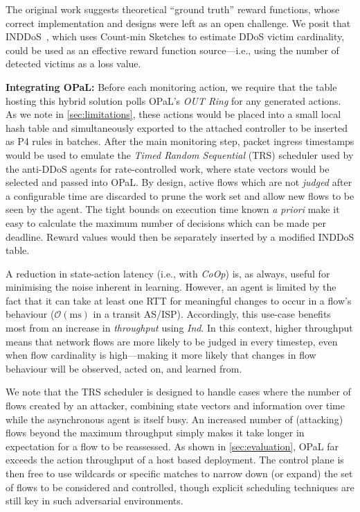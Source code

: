 \documentclass[sigconf,natbib=false]{acmart}
\newcommand{\fakepara}[1]{\noindent\textbf{#1:}}
\newcommand{\approachshort}{OPaL}
\newcommand{\Coopfw}{\emph{CoOp}}
\newcommand{\Indfw}{\emph{Ind}}
\begin{document}
The original work suggests theoretical ``ground truth'' reward functions, whose correct implementation and designs were left as an open challenge. 
We posit that INDDoS~\parencite{tnms-ddos-victim-ident}, which uses Count-min Sketches to estimate DDoS victim cardinality, could be used as an effective reward function source---i.e., using the number of detected victims as a loss value.

\fakepara{Integrating \approachshort}
Before each monitoring action, we require that the table hosting this hybrid solution polls \approachshort{}'s \emph{OUT Ring} for any generated actions.
As we note in \cref{sec:limitations}, these actions would be placed into a small local hash table and simultaneously exported to the attached controller to be inserted as P4 rules in batches.
After the main monitoring step, packet ingress timestamps would be used to emulate the \emph{Timed Random Sequential} (TRS) scheduler used by the anti-DDoS agents for rate-controlled work, where state vectors would be selected and passed into \approachshort.
By design, active flows which are not \emph{judged} after a configurable time are discarded to prune the work set and allow new flows to be seen by the agent.
The tight bounds on execution time known \emph{a priori} make it easy to calculate the maximum number of decisions which can be made per deadline.
Reward values would then be separately inserted by a modified INDDoS table.


A reduction in state-action latency (i.e., with \Coopfw) is, as always, useful for minimising the noise inherent in learning.
However, an agent is limited by the fact that it can take at least one RTT for meaningful changes to occur in a flow's behaviour ($\mathcal{O}{\left(\si{\milli\second}\right)}$ in a transit AS/ISP).
Accordingly, this use-case benefits most from an increase in \emph{throughput} using \Indfw{}.
In this context, higher throughput means that network flows are more likely to be judged in every timestep, even when flow cardinality is high---making it more likely that changes in flow behaviour will be observed, acted on, and learned from.

We note that the TRS scheduler is designed to handle cases where the number of flows created by an attacker, combining state vectors and information over time while the asynchronous agent is itself busy.
An increased number of (attacking) flows beyond the maximum throughput simply makes it take longer in expectation for a flow to be reassessed.
As shown in \cref{sec:evaluation}, \approachshort{} far exceeds the action throughput of a host based deployment.
The control plane is then free to use wildcards or specific matches to narrow down (or expand) the set of flows to be considered and controlled, though explicit scheduling techniques are still key in such adversarial environments.
\end{document}
